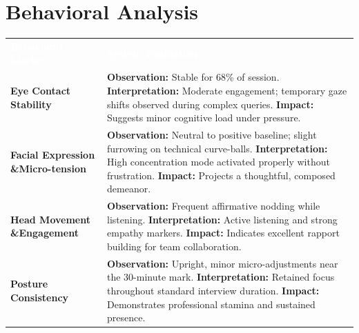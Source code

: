 \documentclass[11pt,a4paper]{article}
\begin{document}
\section{Behavioral Analysis}
\renewcommand{\arraystretch}{1.6}
\begin{tabularx}{\textwidth}{@{} >{\bfseries\color{WiseNavy}}p{4.5cm} X @{}}
  \rowcolor{WiseThemeBg}
  \textcolor{white}{\textbf{Behavioral Marker}} & \textcolor{white}{\textbf{System Evaluation}} \\
  \rowcolor{WiseLight}
  Eye Contact Stability & 
  \textbf{Observation:} Stable for 68\% of session. \newline
  \textbf{Interpretation:} Moderate engagement; temporary gaze shifts observed during complex queries. \newline
  \textbf{Impact:} Suggests minor cognitive load under pressure. \\

  Facial Expression \&\newline Micro-tension & 
  \textbf{Observation:} Neutral to positive baseline; slight furrowing on technical curve-balls.\newline
  \textbf{Interpretation:} High concentration mode activated properly without frustration.\newline
  \textbf{Impact:} Projects a thoughtful, composed demeanor. \\
  
  \rowcolor{WiseLight}
  Head Movement \&\newline Engagement & 
  \textbf{Observation:} Frequent affirmative nodding while listening.\newline
  \textbf{Interpretation:} Active listening and strong empathy markers.\newline
  \textbf{Impact:} Indicates excellent rapport building for team collaboration. \\

  Posture Consistency &
  \textbf{Observation:} Upright, minor micro-adjustments near the 30-minute mark.\newline
  \textbf{Interpretation:} Retained focus throughout standard interview duration.\newline
  \textbf{Impact:} Demonstrates professional stamina and sustained presence. \\
  \bottomrule
\end{tabularx}

\end{document}
